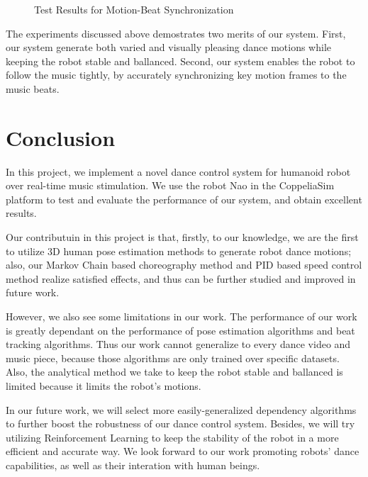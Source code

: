 \documentclass[UTF8,a4paper]{article}
\begin{document}
	\begin{figure}[!h] \centering    
		\caption{Test Results for Motion-Beat Synchronization}     
		\label{synchronize_evaluate}     
	\end{figure} 

	The experiments discussed above demostrates two merits of our system. First, our system generate both varied and visually pleasing dance motions while keeping the robot stable and ballanced. Second, our system enables the robot to follow the music tightly, by accurately synchronizing key motion frames to the music beats.

	\section{Conclusion}\label{section4}

	\noindent In this project, we implement a novel dance control system for humanoid robot over real-time music stimulation. We use the robot Nao in the CoppeliaSim platform to test and evaluate the performance of our system, and obtain excellent results. 

	Our contributuin in this project is that, firstly, to our knowledge, we are the first to utilize 3D human pose estimation methods to generate robot dance motions; also, our Markov Chain based choreography method and PID based speed control method realize satisfied effects, and thus can be further studied and improved in future work.

	However, we also see some limitations in our work. The performance of our work is greatly dependant on the performance of pose estimation algorithms and beat tracking algorithms. Thus our work cannot generalize to every dance video and music piece, because those algorithms are only trained over specific datasets. Also, the analytical method we take to keep the robot stable and ballanced is limited because it limits the robot's motions.

	In our future work, we will select more easily-generalized dependency algorithms to further boost the robustness of our dance control system. Besides, we will try utilizing  Reinforcement Learning to keep the stability of the robot in a more efficient and accurate way. We look forward to our work promoting robots' dance capabilities, as well as their interation with human beings.
	
\end{document}
